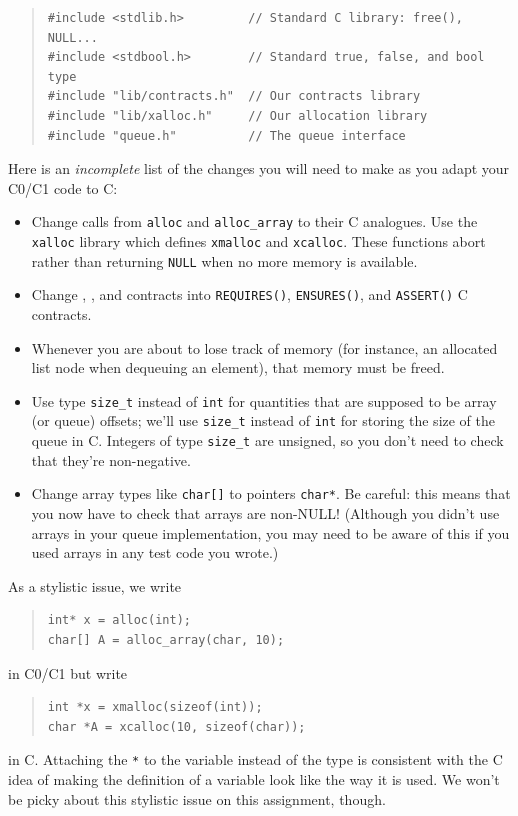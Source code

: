 \documentclass[12pt]{exam}
\begin{document}
\begin{quote}
\begin{lstlisting}[numbers=none]
#include <stdlib.h>         // Standard C library: free(), NULL...
#include <stdbool.h>        // Standard true, false, and bool type
#include "lib/contracts.h"  // Our contracts library
#include "lib/xalloc.h"     // Our allocation library
#include "queue.h"          // The queue interface
\end{lstlisting}
\end{quote}

Here is an \emph{incomplete} list of the changes you will need to make
as you adapt your C0/C1 code to C:

\begin{itemize}
\item%
  Change calls from \lstinline'alloc' and \lstinline'alloc_array' to
  their C analogues. Use the \lstinline'xalloc' library which defines
  \lstinline'xmalloc' and \lstinline'xcalloc'. These functions abort
  rather than returning \lstinline'NULL' when no more memory is
  available.
\item%
  Change \requires{}, \ensures{}, and \assert{} contracts into
  \lstinline'REQUIRES()', \lstinline'ENSURES()', and
  \lstinline'ASSERT()' C contracts.
\item%
  Whenever you are about to lose track of memory (for instance, an
  allocated list node when dequeuing an element), that memory must be
  freed.
\item%
  Use type \lstinline'size_t' instead of \lstinline'int' for
  quantities that are supposed to be array (or queue) offsets; we'll
  use \lstinline'size_t' instead of \lstinline'int' for storing the
  size of the queue in C. Integers of type \lstinline'size_t' are
  unsigned, so you don't need to check that they're non-negative.
\item%
  Change array types like \lstinline'char[]' to pointers
  \lstinline'char*'. Be careful: this means that you now have to check
  that arrays are non-NULL!  (Although you didn't use arrays in your
  queue implementation, you may need to be aware of this if you used
  arrays in any test code you wrote.)
\end{itemize}
As a stylistic issue, we write
\begin{quote}
\begin{lstlisting}[numbers=none]
int* x = alloc(int);
char[] A = alloc_array(char, 10);
\end{lstlisting}
\end{quote}
in C0/C1 but write
\begin{quote}
\begin{lstlisting}[numbers=none]
int *x = xmalloc(sizeof(int));
char *A = xcalloc(10, sizeof(char));
\end{lstlisting}
\end{quote}
in C. Attaching the \lstinline'*' to the variable instead of the type is
consistent with the C idea of making the definition of a variable look
like the way it is used. We won't be picky about this stylistic issue
on this assignment, though.
\end{document}
